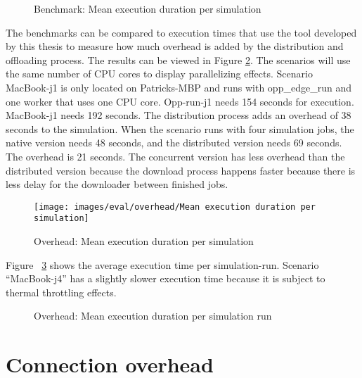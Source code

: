 \begin{figure}[h]
  \centering
  
  \caption{Benchmark: Mean execution duration per simulation}
  \label{fig:eval-benchmark}
\end{figure}

The benchmarks can be compared to execution times that use the tool developed by this thesis to measure how much overhead is added by the distribution and offloading process. The results can be viewed in Figure \ref{fig:eval-overhead}. The scenarios will use the same number of CPU cores to display parallelizing effects. Scenario MacBook-j1 is only located on Patricks-MBP and runs with opp\_edge\_run and one worker that uses one CPU core. Opp-run-j1 needs 154 seconds for execution. MacBook-j1 needs 192 seconds. The distribution process adds an overhead of 38 seconds to the simulation. When the scenario runs with four simulation jobs, the native version needs 48 seconds, and the distributed version needs 69 seconds. The overhead is 21 seconds. The concurrent version has less overhead than the distributed version because the download process happens faster because there is less delay for the downloader between finished jobs. 
\begin{figure}[h]
  \centering
  \texttt{[image: images/eval/overhead/Mean execution duration per simulation]}
  \caption{Overhead: Mean execution duration per simulation}
  \label{fig:eval-overhead}
\end{figure}

Figure ~\ref{fig:eval-overhead-run} shows the average execution time per simulation-run. Scenario “MacBook-j4” has a slightly slower execution time because it is subject to thermal throttling effects. 

\begin{figure}[h]
  \centering
  
  \caption{Overhead: Mean execution duration per simulation run}
  \label{fig:eval-overhead-run}
\end{figure}





\section{Connection overhead}

